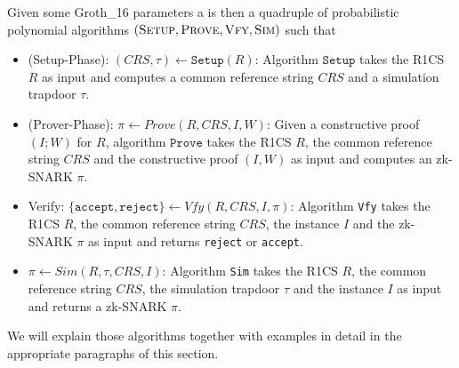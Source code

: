Given some Groth\_16 parameters a  is then a quadruple of probabilistic polynomial algorithms $(\textsc{Setup},\textsc{Prove},\textsc{Vfy},\textsc{Sim})$ such that
\begin{itemize}
\item (Setup-Phase): $(CRS,\tau)\leftarrow \mathtt{Setup}(R)$: Algorithm $\mathtt{Setup}$ takes the R1CS $R$ as input and computes a common reference string $CRS$ and a simulation trapdoor $\tau$.
\item (Prover-Phase): $\pi\leftarrow Prove(R,CRS,I,W)$: Given a constructive proof $(I;W)$ for $R$, algorithm $\mathtt{Prove}$ takes the R1CS $R$, the common reference string $CRS$ and the constructive proof $(I,W)$ as input and computes an zk-SNARK $\pi$.
\item Verify: $\{\mathtt{accept},\mathtt{reject}\}\leftarrow Vfy(R,CRS,I,\pi)$:   Algorithm \texttt{Vfy} takes the R1CS $R$, the common reference string $CRS$, the instance $I$ and the zk-SNARK $\pi$ as input and returns \texttt{reject} or \texttt{accept}.
\item $\pi\leftarrow Sim(R,\tau,CRS, I)$: Algorithm \texttt{Sim} takes the R1CS $R$, the common reference string $CRS$, the simulation trapdoor $\tau$ and the instance $I$ as input and returns a zk-SNARK $\pi$. 
\end{itemize}
We will explain those algorithms together with examples in detail in the appropriate paragraphs of this section.

